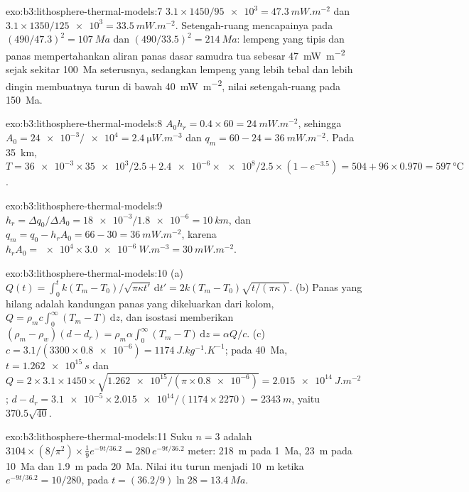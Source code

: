 \begin{solution}{exo:b3:lithosphere-thermal-models:7}
$3.1\times1450/\num{95e3} = \qty{47.3}{mW.m^{-2}}$ dan $3.1\times1350/\num{125e3}
= \qty{33.5}{mW.m^{-2}}$. Setengah-ruang mencapainya pada $(490/47.3)^2 =
\qty{107}{Ma}$ dan $(490/33.5)^2 = \qty{214}{Ma}$: lempeng yang tipis dan panas mempertahankan
aliran panas dasar samudra tua sebesar \qty{47}{mW.m^{-2}} sejak sekitar \qty{100}{Ma}
seterusnya, sedangkan lempeng yang lebih tebal dan lebih dingin membuatnya turun di bawah
\qty{40}{mW.m^{-2}}, nilai setengah-ruang pada \qty{150}{Ma}.
\end{solution}

\begin{solution}{exo:b3:lithosphere-thermal-models:8}
$A_0h_r = 0.4\times60 = \qty{24}{mW.m^{-2}}$, sehingga $A_0 =
\num{24e-3}/\num{e4} = \qty{2.4}{\micro W.m^{-3}}$ dan $q_m = 60 - 24 =
\qty{36}{mW.m^{-2}}$. Pada \qty{35}{km}, $T = \num{36e-3}\times\num{35e3}/2.5 +
\num{2.4e-6}\times\num{e8}/2.5\times(1 - e^{-3.5}) = 504 + 96\times0.970 =
\qty{597}{\celsius}$.
\end{solution}

\begin{solution}{exo:b3:lithosphere-thermal-models:9}
$h_r = \Delta q_0/\Delta A_0 = \num{18e-3}/\num{1.8e-6} = \qty{10}{km}$, dan
$q_m = q_0 - h_rA_0 = 66 - 30 = \qty{36}{mW.m^{-2}}$, karena $h_rA_0 =
\num{e4}\times\qty{3.0e-6}{W.m^{-3}} = \qty{30}{mW.m^{-2}}$.
\end{solution}

\begin{solution}{exo:b3:lithosphere-thermal-models:10}
(a) $Q(t) = \int_0^tk(T_m - T_0)/\sqrt{\pi\kappa t'}\,\mathrm dt' =
2k(T_m - T_0)\sqrt{t/(\pi\kappa)}$. (b) Panas yang hilang adalah kandungan panas
yang dikeluarkan dari kolom, $Q = \rho_mc\int_0^\infty(T_m - T)\,\mathrm dz$, dan
isostasi memberikan $(\rho_m - \rho_w)(d - d_r) = \rho_m\alpha\int_0^\infty(T_m -
T)\,\mathrm dz = \alpha Q/c$. (c) $c = 3.1/(3300\times\num{0.8e-6}) =
\qty{1174}{J.kg^{-1}.K^{-1}}$; pada \qty{40}{Ma}, $t = \qty{1.262e15}{s}$ dan
$Q = 2\times3.1\times1450\times\sqrt{\num{1.262e15}/(\pi\times\num{0.8e-6})} =
\qty{2.015e14}{J.m^{-2}}$; $d - d_r = \num{3.1e-5}\times\num{2.015e14}/
(1174\times2270) = \qty{2343}{m}$, yaitu $370.5\sqrt{40}$.
\end{solution}

\begin{solution}{exo:b3:lithosphere-thermal-models:11}
Suku $n = 3$ adalah $3104\times(8/\pi^2)\times\tfrac19e^{-9t/36.2} =
280\,e^{-9t/36.2}$ meter: \qty{218}{m} pada \qty{1}{Ma}, \qty{23}{m} pada
\qty{10}{Ma} dan \qty{1.9}{m} pada \qty{20}{Ma}. Nilai itu turun menjadi \qty{10}{m} ketika
$e^{-9t/36.2} = 10/280$, pada $t = (36.2/9)\ln28 = \qty{13.4}{Ma}$.
\end{solution}

